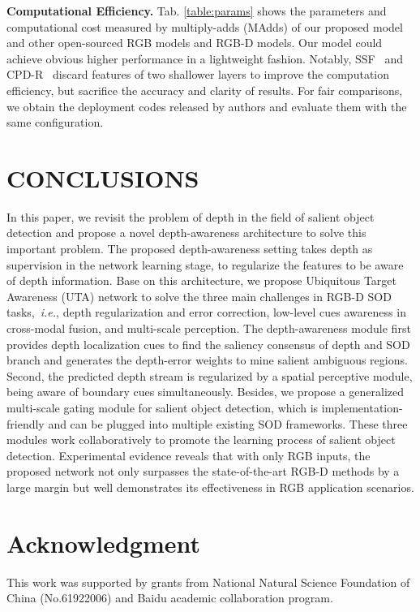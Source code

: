 \documentclass[journal]{IEEEtran}
\def\ie{{\em i.e.}}
\newcommand{\tabref}[1]{Tab. \ref{#1}}
\begin{document}
\textbf{Computational Efficiency.} \tabref{table:params} shows the parameters and computational cost measured by multiply-adds (MAdds) of our proposed model and other open-sourced RGB models and RGB-D models. Our model could achieve obvious higher performance in a lightweight fashion. Notably, SSF~\cite{zhang2020select} and CPD-R~\cite{wu2019cascaded} discard features of two shallower layers to improve the computation efficiency, but sacrifice the accuracy and clarity of results. For fair comparisons, we obtain the deployment codes released by authors and evaluate them with the same configuration.



\section{CONCLUSIONS}\label{sec:conclusion}
In this paper, we revisit the problem of depth in the field of salient object detection and propose a novel depth-awareness architecture to solve this important problem. The proposed depth-awareness setting takes depth as supervision in the network learning stage, to regularize the features to be aware of depth information. Base on this architecture, we propose Ubiquitous Target Awareness (UTA) network to solve the three main challenges in RGB-D SOD tasks,~\ie, depth regularization and error correction, low-level cues awareness in cross-modal fusion, and multi-scale perception. The depth-awareness module first provides depth localization cues to find the saliency consensus of depth and SOD branch and generates the depth-error weights to mine salient ambiguous regions. Second, the predicted depth stream is regularized by a spatial perceptive module, being aware of boundary cues simultaneously. Besides, we propose a generalized multi-scale gating module for salient object detection, which is implementation-friendly and can be plugged into multiple existing SOD frameworks.
These three modules work collaboratively to promote the learning process of salient object detection.
Experimental evidence reveals that with only RGB inputs, the proposed network not only surpasses the state-of-the-art RGB-D methods by a large margin but well demonstrates its effectiveness in RGB application scenarios.










\section*{Acknowledgment}
This work was supported by grants from National Natural Science Foundation of China (No.61922006) and Baidu academic collaboration program.

\ifCLASSOPTIONcaptionsoff
  \newpage
\fi








\balance
\end{document}
